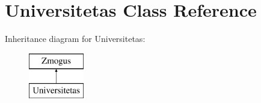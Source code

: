 \hypertarget{class_universitetas}{}\section{Universitetas Class Reference}
\label{class_universitetas}
Inheritance diagram for Universitetas\+:\begin{figure}[H]
\begin{center}
\leavevmode
\includegraphics[height=2.000000cm]{class_universitetas}
\end{center}
\end{figure}
